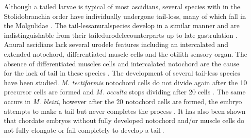 Although a tailed larvae is typical of most ascidians, several species with in the Stolidobranchia order have individually undergone tail-loss, many of which fall in the Molgulidae \cite{berrill_studies_1931, jeffery_evolution_1999, huber_evolution_2000, maliska_molgula_2010}. The tail-less\textemdash anural\textemdash species develop in a similar manner and are indistinguishable from their tailed\textemdash urodele\textemdash counterparts up to late gastrulation \cite{berrill_studies_1931, swalla_interspecific_1990, jeffery_factors_1992}. Anural ascidians lack several urodele features including an intercalated and extended notochord, differentiated muscle cells and the otilith sensory organ. The absence of differentiated muscles cells and intercalated notochord are the cause for the lack of tail in these species \cite{miyamoto_formation_1985, swalla_interspecific_1990}. The development of several tail-less species have been studied. \textit{M. tectiformis} notochord cells do not divide again after the 10 precursor cells are formed and \textit{M. occulta} stops dividing after 20 cells \cite{jeffery_evolution_1999}. The same occurs in \textit{M. bleizi}, however after the 20 notochord cells are formed, the embryo attempts to make a tail but never completes the process \cite{swalla_novel_1993}. It has also been shown that chordate embryos without fully developed notochord and/or muscle cells do not fully elongate or fail completely to develop a tail \cite{jeffery_evolution_1999,takada_brachyury_2002,stemple_structure_2005}. 
